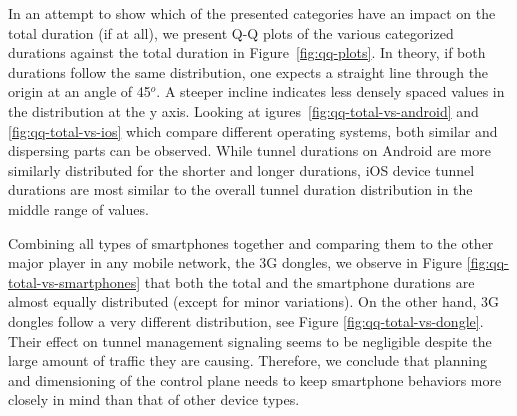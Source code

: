 

In an attempt to show which of the presented categories have an impact on the total duration (if at all), we present Q-Q plots of the various categorized durations against the total duration in Figure~\ref{fig:qq-plots}. In theory, if both durations follow the same distribution, one expects a straight line through the origin at an angle of 45$^o$. A steeper incline indicates less densely spaced values in the distribution at the y axis. Looking at igures~\ref{fig:qq-total-vs-android} and \ref{fig:qq-total-vs-ios} which compare different operating systems, both similar and dispersing parts can be observed. While tunnel durations on Android  are more similarly distributed for the shorter and longer durations, iOS device tunnel durations are most similar to the overall tunnel duration distribution in the middle range of values.

Combining all types of smartphones together and comparing them to the other major player in any mobile network, the 3G dongles, we observe in Figure \ref{fig:qq-total-vs-smartphones} that both the total and the smartphone durations are almost equally distributed (except for minor variations). On the other hand, 3G dongles follow a very different distribution, see Figure \ref{fig:qq-total-vs-dongle}. Their effect on tunnel management signaling seems to be negligible despite the  large amount of traffic they are causing. Therefore, we conclude that planning and dimensioning of the control plane needs to keep smartphone behaviors more closely in mind than that of other device types.


